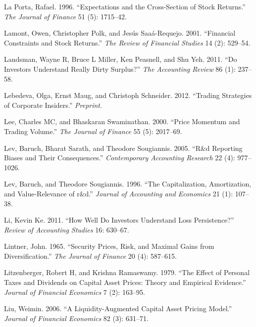 \documentclass[
  letterpaper,
  DIV=11,
  numbers=noendperiod]{scrreprt}
\newlength{\cslhangindent}
\newlength{\cslentryspacingunit} %
\newenvironment{CSLReferences}[2] %
 {%
  \setlength{\parindent}{0pt}
  \ifodd #1
  \let\oldpar\par
  \def\par{\hangindent=\cslhangindent\oldpar}
  \fi
  \setlength{\parskip}{#2\cslentryspacingunit}
 }%
 {}
\begin{document}
\begin{CSLReferences}{1}{0}
\leavevmode{}%
La Porta, Rafael. 1996. {``Expectations and the Cross-Section of Stock
Returns.''} \emph{The Journal of Finance} 51 (5): 1715--42.

\leavevmode{}%
Lamont, Owen, Christopher Polk, and Jesús Saaá-Requejo. 2001.
{``Financial Constraints and Stock Returns.''} \emph{The Review of
Financial Studies} 14 (2): 529--54.

\leavevmode{}%
Landsman, Wayne R, Bruce L Miller, Ken Peasnell, and Shu Yeh. 2011.
{``Do Investors Understand Really Dirty Surplus?''} \emph{The Accounting
Review} 86 (1): 237--58.

\leavevmode{}%
Lebedeva, Olga, Ernst Maug, and Christoph Schneider. 2012. {``Trading
Strategies of Corporate Insiders.''} \emph{Preprint}.

\leavevmode{}%
Lee, Charles MC, and Bhaskaran Swaminathan. 2000. {``Price Momentum and
Trading Volume.''} \emph{The Journal of Finance} 55 (5): 2017--69.

\leavevmode{}%
Lev, Baruch, Bharat Sarath, and Theodore Sougiannis. 2005. {``R\&d
Reporting Biases and Their Consequences.''} \emph{Contemporary
Accounting Research} 22 (4): 977--1026.

\leavevmode{}%
Lev, Baruch, and Theodore Sougiannis. 1996. {``The Capitalization,
Amortization, and Value-Relevance of r\&d.''} \emph{Journal of
Accounting and Economics} 21 (1): 107--38.

\leavevmode{}%
Li, Kevin Ke. 2011. {``How Well Do Investors Understand Loss
Persistence?''} \emph{Review of Accounting Studies} 16: 630--67.

\leavevmode{}%
Lintner, John. 1965. {``Security Prices, Risk, and Maximal Gains from
Diversification.''} \emph{The Journal of Finance} 20 (4): 587--615.

\leavevmode{}%
Litzenberger, Robert H, and Krishna Ramaswamy. 1979. {``The Effect of
Personal Taxes and Dividends on Capital Asset Prices: Theory and
Empirical Evidence.''} \emph{Journal of Financial Economics} 7 (2):
163--95.

\leavevmode{}%
Liu, Weimin. 2006. {``A Liquidity-Augmented Capital Asset Pricing
Model.''} \emph{Journal of Financial Economics} 82 (3): 631--71.


\end{CSLReferences}
\end{document}
